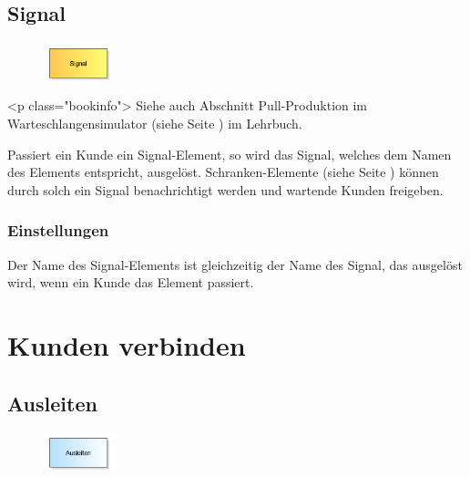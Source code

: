 \section{Signal}
\label{ref:ModelElementSignal}

\begin{figure}
\vspace{-22pt}
\includegraphics[width=2cm]{imageModelElementSignal.png}
\vspace{-22pt}
\end{figure}

<p class="bookinfo">
Siehe auch Abschnitt Pull-Produktion im Warteschlangensimulator (siehe Seite \pageref{ref:book:7.6.3}) im Lehrbuch.

Passiert ein Kunde ein Signal-Element, so wird das Signal, welches dem Namen des Elements entspricht, ausgelöst.
Schranken-Elemente (siehe Seite \pageref{ref:ModelElementBarrier}) können durch solch ein Signal benachrichtigt werden und
wartende Kunden freigeben.

\subsection*{Einstellungen}

Der Name des Signal-Elements ist gleichzeitig der Name des Signal, das ausgelöst wird, wenn ein Kunde das Element passiert.





\chapter{Kunden verbinden}

\section{Ausleiten}
\label{ref:ModelElementPickUp}

\begin{figure}
\vspace{-22pt}
\includegraphics[width=2cm]{imageModelElementPickUp.png}
\vspace{-22pt}
\end{figure}

